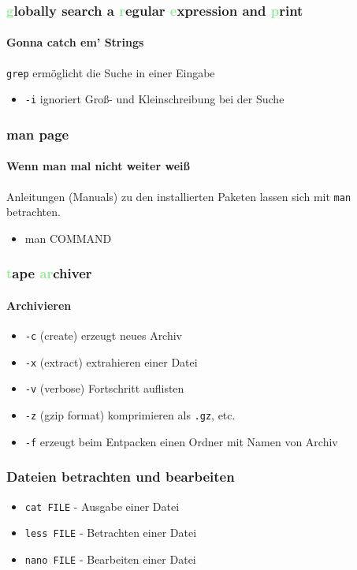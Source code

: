\documentclass[12pt,utf8]{beamer}
\begin{document}
\begin{frame}
\frametitle{\Large{\textcolor{lightGreen}{g}lobally search a \textcolor{lightGreen}{r}egular \textcolor{lightGreen}{e}xpression and \textcolor{lightGreen}{p}rint}}
\framesubtitle{Gonna catch em' Strings}
\texttt{grep} ermöglicht die Suche in einer Eingabe
\begin{itemize}
	\item \texttt{-i} ignoriert Groß- und Kleinschreibung bei der Suche
\end{itemize}
\end{frame}

\begin{frame}
\frametitle{man page}
\framesubtitle{Wenn man mal nicht weiter weiß}
Anleitungen (Manuals) zu den installierten Paketen lassen sich mit \texttt{man} betrachten.
\begin{itemize}
	\item man COMMAND
\end{itemize}
\end{frame}

\begin{frame}
\frametitle{\textcolor{lightGreen}{t}ape \textcolor{lightGreen}{ar}chiver}
\framesubtitle{Archivieren}
\begin{itemize}[<+->]
\item {\scriptsize \texttt{-c} (create) erzeugt neues Archiv}
\item {\scriptsize \texttt{-x} (extract) extrahieren einer Datei}
\item {\scriptsize \texttt{-v} (verbose) Fortschritt auflisten}
\item {\scriptsize \texttt{-z} (gzip format) komprimieren als \texttt{.gz}, etc.}
\item {\scriptsize \texttt{-f} erzeugt beim Entpacken einen Ordner mit Namen von Archiv}
\end{itemize}
\end{frame}

\begin{frame}
\frametitle{\Large Dateien betrachten und bearbeiten}
\begin{itemize}
	\item \texttt{cat FILE} - Ausgabe einer Datei
	\item \texttt{less FILE} - Betrachten einer Datei
	\item \texttt{nano FILE} - Bearbeiten einer Datei
\end{itemize}
\end{frame}
\end{document}
